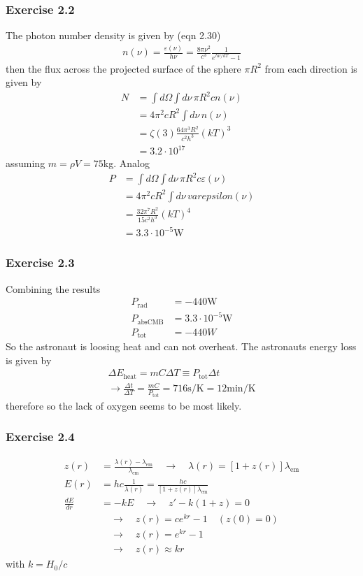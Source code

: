 \documentclass[10pt,a4paper]{article}
\theoremstyle{definition}
\begin{document}
\subsubsection{Exercise 2.2}
The photon number density is given by (eqn 2.30)
\begin{align}
n(\nu)=\frac{\varepsilon(\nu)}{h\nu}=\frac{8\pi\nu^2}{c^3}\frac{1}{e^{h\nu/kT}-1}
\end{align}
then the flux across the projected surface of the sphere $\pi R^2$ from each direction is given by  
\begin{align}
N&=\int d\Omega\int d\nu\,\pi R^2 cn(\nu)\\
&=4\pi^2 cR^2\int d\nu\, n(\nu)\\
&=\zeta(3)\frac{64\pi^3R^2}{c^2h^3}(kT)^3\\
&=3.2\cdot10^{17}
\end{align}
assuming $m=\rho V=75$kg. Analog
\begin{align}
P&=\int d\Omega\int d\nu\,\pi R^2 c\varepsilon(\nu)\\
&=4\pi^2 cR^2\int d\nu\, varepsilon(\nu)\\
&=\frac{32\pi^7R^2}{15c^2h^3}(kT)^4\\
&=3.3\cdot10^{-5}\text{W}
\end{align}

\subsubsection{Exercise 2.3}
Combining the results
\begin{align}
P_\text{rad}&=-440\text{W}\\
P_\text{absCMB}&=3.3\cdot10^{-5}\text{W}\\
P_\text{tot}&=-440W
\end{align}
So the astronaut is loosing heat and can not overheat.
The astronauts energy loss is given by
\begin{align}
\Delta E_\text{heat}=mC\Delta T\equiv P_\text{tot}\Delta t\\
\rightarrow \frac{\Delta t}{\Delta T}=\frac{mC}{P_\text{tot}}=716\text{s/K}=12\text{min/K}
\end{align}
therefore so the lack of oxygen seems to be most likely.

\subsubsection{Exercise 2.4}
\begin{align}
z(r)&=\frac{\lambda(r)-\lambda_\text{em}}{\lambda_\text{em}}\quad\rightarrow\quad\lambda(r)=[1+z(r)]\lambda_\text{em}\\
E(r)&=hc\frac{1}{\lambda(r)}=\frac{hc}{[1+z(r)]\lambda_\text{em}}\\
\frac{dE}{dr}&=-kE\quad\rightarrow\quad z'-k(1+z)=0\\
&\quad\rightarrow\quad z(r)=ce^{kr}-1 \quad(z(0)=0) \\
&\quad\rightarrow\quad z(r)=e^{kr}-1\\
&\quad\rightarrow\quad z(r)\approx kr
\end{align}
with $k=H_0/c$
\end{document}
